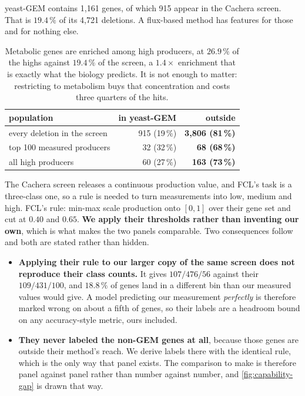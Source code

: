yeast-GEM contains 1,161 genes, of which 915 appear in the Cachera screen. That is
$19.4\,\%$ of its 4,721 deletions. A flux-based method has features for those and for
nothing else.

\begin{table}[htbp]
\centering\small
\begin{tabular}{lrr}
\toprule
population & in yeast-GEM & outside \\
\midrule
every deletion in the screen & 915 (19\,\%) & \textbf{3{,}806 (81\,\%)} \\
top 100 measured producers & 32 (32\,\%) & \textbf{68 (68\,\%)} \\
all high producers & 60 (27\,\%) & \textbf{163 (73\,\%)} \\
\bottomrule
\end{tabular}
\caption[]{Metabolic genes are enriched among high producers, at $26.9\,\%$ of the highs
against $19.4\,\%$ of the screen, a $1.4\times$ enrichment that is exactly what the biology
predicts. It is not enough to matter: restricting to metabolism buys that concentration and
costs three quarters of the hits.}
\label{tab:gem-coverage}
\end{table}


 The
Cachera screen releases a continuous production value, and FCL's task is a three-class
one, so a rule is needed to turn measurements into low, medium and high. FCL's rule:
min-max scale production onto $[0, 1]$ over their gene set and cut at $0.40$ and $0.65$.
\textbf{We apply their thresholds rather than inventing our own}, which is what makes the
two panels comparable. Two consequences follow and both are stated rather than hidden.

\begin{itemize}
\item \textbf{Applying their rule to our larger copy of the same screen does not reproduce
  their class counts.} It gives $107/476/56$ against their $109/431/100$, and $18.8\,\%$ of
  genes land in a different bin than our measured values would give. A model predicting our
  measurement \emph{perfectly} is therefore marked wrong on about a fifth of genes, so their
  labels are a headroom bound on any accuracy-style metric, ours included.
\item \textbf{They never labeled the non-GEM genes at all}, because those genes are outside
  their method's reach. We derive labels there with the identical rule, which is the only
  way that panel exists. The comparison to make is therefore panel against panel rather than
  number against number, and \cref{fig:capability-gap} is drawn that way.
\end{itemize}

